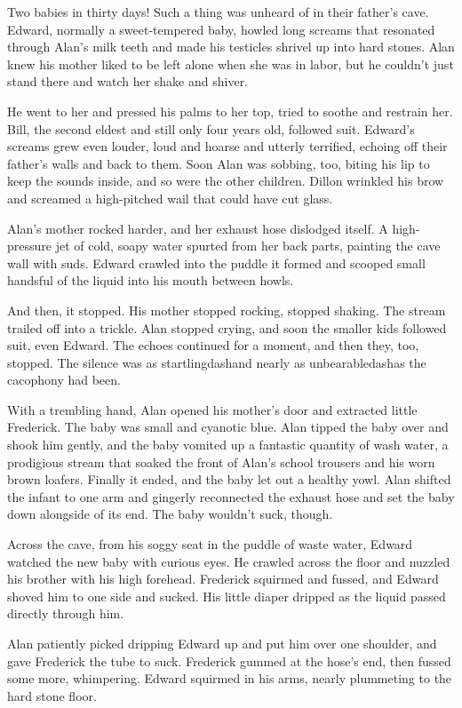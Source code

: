 Two babies in thirty days!  Such a thing was unheard of in their
father's cave.  Edward, normally a sweet-tempered baby, howled long
screams that resonated through Alan's milk teeth and made his
testicles shrivel up into hard stones.  Alan knew his mother liked to
be left alone when she was in labor, but he couldn't just stand there
and watch her shake and shiver.

He went to her and pressed his palms to her top, tried to soothe and
restrain her.  Bill, the second eldest and still only four years old,
followed suit.  Edward's screams grew even louder, loud and hoarse and
utterly terrified, echoing off their father's walls and back to them. 
Soon Alan was sobbing, too, biting his lip to keep the sounds inside,
and so were the other children.  Dillon wrinkled his brow and screamed
a high-pitched wail that could have cut glass.

Alan's mother rocked harder, and her exhaust hose dislodged itself.  A
high-pressure jet of cold, soapy water spurted from her back parts,
painting the cave wall with suds.  Edward crawled into the puddle it
formed and scooped small handsful of the liquid into his mouth between
howls.

And then, it stopped.  His mother stopped rocking, stopped shaking. 
The stream trailed off into a trickle.  Alan stopped crying, and soon
the smaller kids followed suit, even Edward.  The echoes continued for
a moment, and then they, too, stopped.  The silence was as
startlingdash{}and nearly as unbearabledash{}as the cacophony had been.

With a trembling hand, Alan opened his mother's door and extracted
little Frederick.  The baby was small and cyanotic blue.  Alan tipped
the baby over and shook him gently, and the baby vomited up a
fantastic quantity of wash water, a prodigious stream that soaked the
front of Alan's school trousers and his worn brown loafers.  Finally
it ended, and the baby let out a healthy yowl.  Alan shifted the
infant to one arm and gingerly reconnected the exhaust hose and set
the baby down alongside of its end.  The baby wouldn't suck, though.

Across the cave, from his soggy seat in the puddle of waste water,
Edward watched the new baby with curious eyes.  He crawled across the
floor and nuzzled his brother with his high forehead.  Frederick
squirmed and fussed, and Edward shoved him to one side and sucked. 
His little diaper dripped as the liquid passed directly through him.

Alan patiently picked dripping Edward up and put him over one
shoulder, and gave Frederick the tube to suck.  Frederick gummed at
the hose's end, then fussed some more, whimpering.  Edward squirmed in
his arms, nearly plummeting to the hard stone floor.

